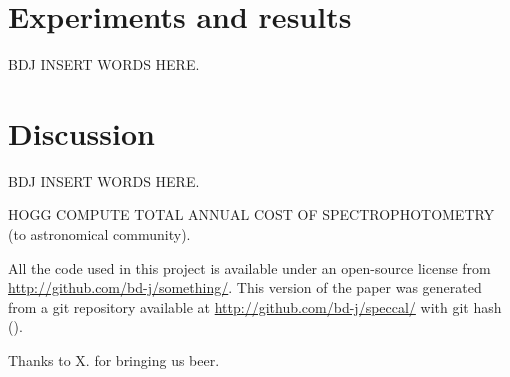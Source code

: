 \documentclass[12pt, letterpaper, preprint]{aastex}
\begin{document}
\section{Experiments and results}

BDJ INSERT WORDS HERE.

\section{Discussion}

BDJ INSERT WORDS HERE.

HOGG COMPUTE TOTAL ANNUAL COST OF SPECTROPHOTOMETRY (to astronomical community).

All the code used in this project is available under an open-source license
  from \url{http://github.com/bd-j/something/}.
This version of the paper was generated
  from a git repository available at \url{http://github.com/bd-j/speccal/}
  with git hash \texttt{\githash} (\gitdate).

\acknowledgements
Thanks to X. for bringing us beer.
\end{document}

